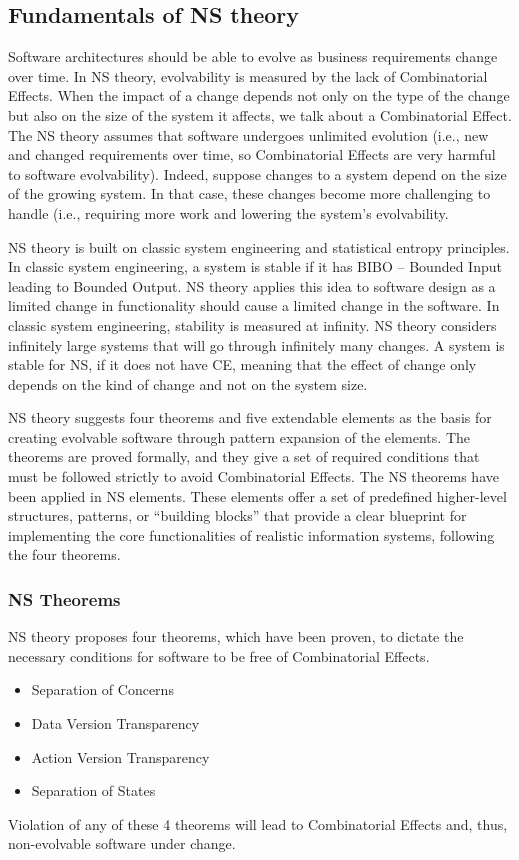 \subsection{Fundamentals of NS theory}\label{NS Fundamentals} Software architectures
should be able to evolve as business requirements change over time. In NS theory,
evolvability is measured by the lack of Combinatorial Effects. When the impact of a change
depends not only on the type of the change but also on the size of the system it affects,
we talk about a Combinatorial Effect. The NS theory assumes that software undergoes
unlimited evolution (i.e., new and changed requirements over time, so Combinatorial
Effects are very harmful to software evolvability). Indeed, suppose changes to a system
depend on the size of the growing system. In that case, these changes become more
challenging to handle (i.e., requiring more work and lowering the system's evolvability. 

NS theory is built on classic system engineering and statistical entropy principles. In
classic system engineering, a system is stable if it has BIBO – Bounded Input leading to
Bounded Output. NS theory applies this idea to software design as a limited change in
functionality should cause a limited change in the software. In classic system
engineering, stability is measured at infinity. NS theory considers infinitely large
systems that will go through infinitely many changes. A system is stable for NS, if it
does not have CE, meaning that the effect of change only depends on the kind of change and
not on the system size.

NS theory suggests four theorems and five extendable elements as the basis for creating
evolvable software through pattern expansion of the elements. The theorems are proved
formally, and they give a set of required conditions that must be followed strictly to
avoid Combinatorial Effects. The NS theorems have been applied in NS elements. These
elements offer a set of predefined higher-level structures, patterns, or “building blocks”
that provide a clear blueprint for implementing the core functionalities of realistic
information systems, following the four theorems.
%
%
\subsubsection{NS Theorems}\label{NS Theorems}
NS theory proposes four theorems, which have been proven, to dictate the necessary conditions for software to be free of Combinatorial Effects.
\begin{itemize}
    \item Separation of Concerns 
    \item Data Version Transparency
    \item Action Version Transparency 
    \item Separation of States
\end{itemize}
Violation of any of these 4 theorems will lead to Combinatorial Effects and, thus, non-evolvable software under change.
%
%
